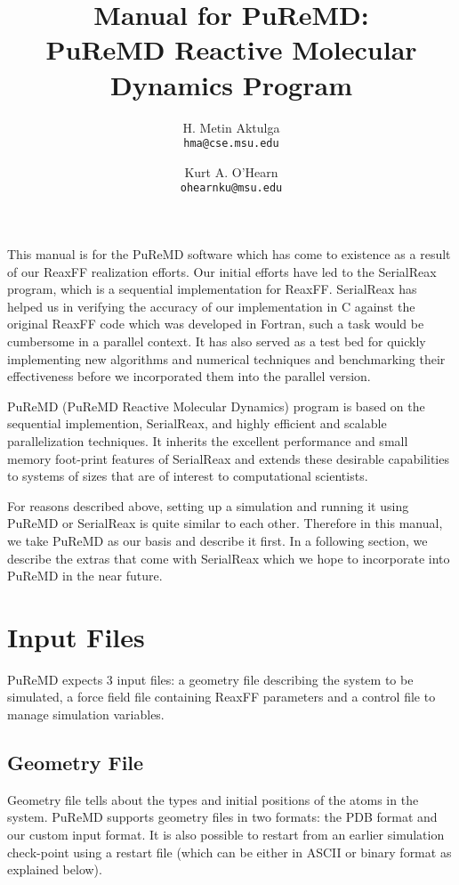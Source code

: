 \documentclass{article}
\title{Manual for PuReMD: \\
  {\bf Pu}ReMD {\bf Re}active {\bf M}olecular {\bf D}ynamics Program}
\author{
  H. Metin Aktulga \\
  \texttt{hma@cse.msu.edu} \\
  \and
  Kurt A. O'Hearn \\
  \texttt{ohearnku@msu.edu}
}
\begin{document}
\maketitle

This manual is for the PuReMD software which has
come to existence as a result of our ReaxFF realization efforts. 
Our initial efforts have led to the SerialReax program, which is a 
sequential implementation for ReaxFF. SerialReax has helped us in verifying 
the accuracy of our implementation in C against the original ReaxFF code 
which was developed in Fortran, such a task would be cumbersome in a parallel 
context. It has also served as a test bed for quickly implementing new 
algorithms and numerical techniques and benchmarking their effectiveness 
before we incorporated them into the parallel version.

PuReMD (PuReMD Reactive Molecular Dynamics) program is based on the 
sequential implemention, SerialReax, and highly efficient and scalable
parallelization techniques. It inherits the excellent 
performance and small memory foot-print features of SerialReax and 
extends these desirable capabilities to systems of sizes that are of
interest to computational scientists. 

For reasons described above, setting up a simulation and running it using 
PuReMD or SerialReax is quite similar to each other. Therefore in this 
manual, we take PuReMD as our basis and describe it first. In a following 
section, we describe the extras that come with SerialReax which we hope 
to incorporate into PuReMD in the near future.


\section{Input Files}
\label{sec:puremd_inp}

PuReMD expects 3 input files: a geometry file describing the system to be 
simulated, a force field file containing ReaxFF parameters and a control 
file to manage simulation variables.


\subsection{Geometry File}
\label{sec:puremd_geo}

Geometry file tells about the types and initial positions of the atoms 
in the system. PuReMD supports geometry files in two formats: 
the PDB format and our custom input format. It is also possible to 
restart from an earlier simulation check-point using a restart file
(which can be either in ASCII or binary format as explained below). 
\end{document}
